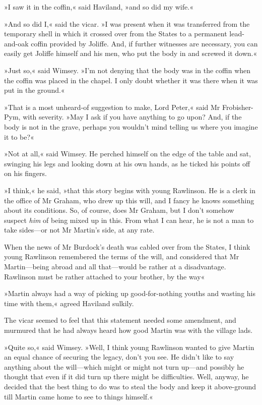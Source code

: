 »I saw it in the coffin,« said Haviland, »and so did my wife.«

»And so did I,« said the vicar. »I was present when it was transferred from the temporary shell in which it crossed over from the States to a permanent lead-and-oak coffin provided by Joliffe. And, if further witnesses are necessary, you can easily get Joliffe himself and his men, who put the body in and screwed it down.«

»Just so,« said Wimsey. »I'm not denying that the body was in the coffin when the coffin was placed in the chapel. I only doubt whether it was there when it was put in the ground.«

»That is a most unheard-of suggestion to make, Lord Peter,« said Mr Frobisher-Pym, with severity. »May I ask if you have anything to go upon? And, if the body is not in the grave, perhaps you wouldn't mind telling us where you imagine it to be?«

»Not at all,« said Wimsey. He perched himself on the edge of the table and sat, swinging his legs and looking down at his own hands, as he ticked his points off on his fingers.

»I think,« he said, »that this story begins with young Rawlinson. He is a clerk in the office of Mr Graham, who drew up this will, and I fancy he knows something about its conditions. So, of course, does Mr Graham, but I don't somehow suspect \textit{him} of being mixed up in this. From what I can hear, he is not a man to take sides—or not Mr Martin's side, at any rate.

When the news of Mr Burdock's death was cabled over from the States, I think young Rawlinson remembered the terms of the will, and considered that Mr Martin—being abroad and all that—would be rather at a disadvantage. Rawlinson must be rather attached to your brother, by the way\longdash«

»Martin always had a way of picking up good-for-nothing youths and wasting his time with them,« agreed Haviland sulkily.

The vicar seemed to feel that this statement needed some amendment, and murmured that he had always heard how good Martin was with the village lads.

»Quite so,« said Wimsey. »Well, I think young Rawlinson wanted to give Martin an equal chance of securing the legacy, don't you see. He didn't like to say anything about the will—which might or might not turn up—and possibly he thought that even if it did turn up there might be difficulties. Well, anyway, he decided that the best thing to do was to steal the body and keep it above-ground till Martin came home to see to things himself.«

